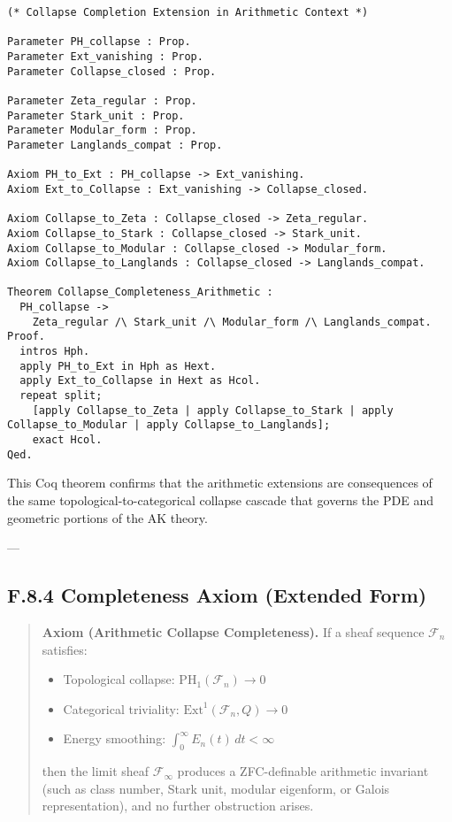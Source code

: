 \documentclass[11pt]{article}
\begin{document}
\begin{axiom}
\begin{axiom}
{{\begin{verbatim}
(* Collapse Completion Extension in Arithmetic Context *)

Parameter PH_collapse : Prop.
Parameter Ext_vanishing : Prop.
Parameter Collapse_closed : Prop.

Parameter Zeta_regular : Prop.
Parameter Stark_unit : Prop.
Parameter Modular_form : Prop.
Parameter Langlands_compat : Prop.

Axiom PH_to_Ext : PH_collapse -> Ext_vanishing.
Axiom Ext_to_Collapse : Ext_vanishing -> Collapse_closed.

Axiom Collapse_to_Zeta : Collapse_closed -> Zeta_regular.
Axiom Collapse_to_Stark : Collapse_closed -> Stark_unit.
Axiom Collapse_to_Modular : Collapse_closed -> Modular_form.
Axiom Collapse_to_Langlands : Collapse_closed -> Langlands_compat.

Theorem Collapse_Completeness_Arithmetic :
  PH_collapse ->
    Zeta_regular /\ Stark_unit /\ Modular_form /\ Langlands_compat.
Proof.
  intros Hph.
  apply PH_to_Ext in Hph as Hext.
  apply Ext_to_Collapse in Hext as Hcol.
  repeat split;
    [apply Collapse_to_Zeta | apply Collapse_to_Stark | apply Collapse_to_Modular | apply Collapse_to_Langlands];
    exact Hcol.
Qed.
\end{verbatim}

This Coq theorem confirms that the arithmetic extensions are consequences of the same topological-to-categorical collapse cascade  
that governs the PDE and geometric portions of the AK theory.

---

\subsection*{F.8.4 Completeness Axiom (Extended Form)}

\begin{quote}
\textbf{Axiom (Arithmetic Collapse Completeness).}  
If a sheaf sequence \( \mathcal{F}_n \) satisfies:
\begin{itemize}
  \item Topological collapse: \( \mathrm{PH}_1(\mathcal{F}_n) \to 0 \)
  \item Categorical triviality: \( \mathrm{Ext}^1(\mathcal{F}_n, Q) \to 0 \)
  \item Energy smoothing: \( \int_0^\infty E_n(t)\,dt < \infty \)
\end{itemize}
then the limit sheaf \( \mathcal{F}_\infty \) produces a ZFC-definable arithmetic invariant  
(such as class number, Stark unit, modular eigenform, or Galois representation),  
and no further obstruction arises.


\end{quote}}}
\end{axiom}
\end{axiom}
\end{document}
